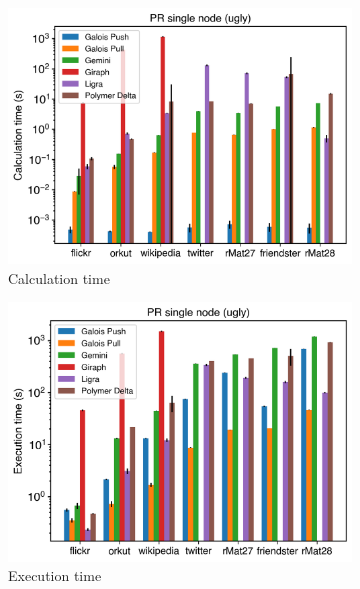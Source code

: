 \begin{figure}
	\begin{subfigure}{0.32\textwidth}
		\includegraphics[width=\linewidth]{../../plots/singleNodePR_calcTime.png}
		\caption{Calculation time}
		\label{fig:singleNodePR_calc}
	\end{subfigure}
	\hfil
	\begin{subfigure}{0.32\textwidth}
		\includegraphics[width=\linewidth]{../../plots/singleNodePR_execTime.png}
		\caption{Execution time}
		\label{fig:singleNodePR_exec}
	\end{subfigure}
	\hfil
	\begin{subfigure}{0.32\textwidth}

\end{subfigure}
\end{figure}
